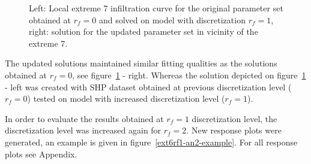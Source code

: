 \documentclass[review,times,3p,twocolumn,10pt]{elsarticle}
\begin{document}
\begin{figure}
\caption{Left: Local extreme 7 infiltration curve for the original parameter set obtained at $r_f=0$ and solved on model with discretization $r_f=1$, right: solution for the updated parameter set in  vicinity of the extreme 7.}
\label{rf1examples}
\end{figure}

The updated solutions maintained similar fitting qualities as the solutions obtained at $r_f=0$, see figure~\ref{rf1examples} - right. Whereas the solution depicted on figure~\ref{rf1examples} - left was created with SHP dataset obtained at previous discretization level ($r_f=0$) tested on model with increased discretization level ($r_f=1$).

In order to evaluate the results obtained at $r_f=1$ discretization level, the discretization level was increased again for $r_f=2$.  New response plots were generated, an example is given in figure~\ref{ext6rf1-an2-example}. For all response plots see Appendix.
\end{document}
